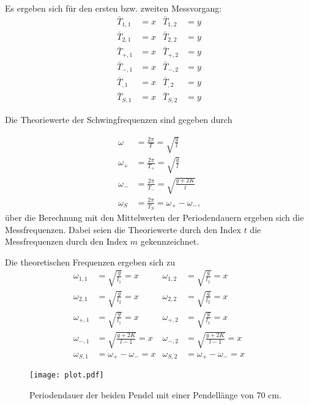 Es ergeben sich für den ersten bzw. zweiten Messvorgang:
\begin{align}
  \bar{T}_{1,1} & = x  & \bar{T}_{1,2} & = y \\
  \bar{T}_{2,1} & = x  & \bar{T}_{2,2} & = y \\ 
  \bar{T}_{+,1} & = x  & \bar{T}_{+,2} & = y \\
  \bar{T}_{-,1} & = x  & \bar{T}_{-,2} & = y \\
  \bar{T}_{,1}  & = x  & \bar{T}_{,2}  & = y \\
  \bar{T}_{S,1} & = x  & \bar{T}_{S,2} & = y 
\end{align}

Die Theoriewerte der Schwingfrequenzen sind gegeben durch

\begin{align}
  \omega   & = \frac{2π}{T}     =   \sqrt{\frac{g}{l}} \\
  \omega_+ & = \frac{2π}{T_+} =   \sqrt{\frac{g}{l}} \\
  \omega_- & = \frac{2π}{T_-} =\sqrt{\frac{g+2K}{l}} \\
  \omega_S & = \frac{2π}{T_S} =  \omega_+ -\omega_- \text{,}
\end{align}
über die Berechnung mit den Mittelwerten der Periodendauern ergeben sich die Messfrequenzen. Dabei seien die Theoriewerte durch den Index $t$
die Messfrequenzen durch den Index $m$ gekennzeichnet.

Die theoretischen Frequenzen ergeben sich zu
\begin{align}
\omega_{1,1} & = \sqrt{\frac{g}{l_1}}     = x & \omega_{1,2} & = \sqrt{\frac{g}{l_1}}     = x \\
\omega_{2,1} & = \sqrt{\frac{g}{l_2}}     = x & \omega_{2,2} & = \sqrt{\frac{g}{l_2}}     = x \\
\omega_{+,1} & = \sqrt{\frac{g}{l_1}}     = x & \omega_{+,2} & = \sqrt{\frac{g}{l_1}}     = x \\
\omega_{-,1} & = \sqrt{\frac{g+2K}{l-1}}  = x & \omega_{-,2} & = \sqrt{\frac{g+2K}{l-1}}  = x \\
\omega_{S,1} & = \omega_+ -\omega_-       = x & \omega_{S,2} & = \omega_+ -\omega_-       = x
\end{align} 



\begin{figure}
  \centering
  \texttt{[image: plot.pdf]}
  \caption{Periodendauer der beiden Pendel mit einer Pendellänge von 70 cm.}
  \label{fig:plot}
\end{figure}


